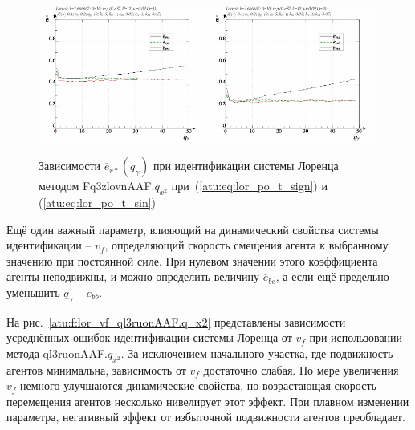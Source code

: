 \begin{figure}[ht!]
  \centerline{
    \includegraphics[width=0.49\textwidth]{p/cha/lor/Fq3zlovnAAF/lor_Fq3zlovnAAF_qx2-p_qg_e_sign.png}
    \hfill
    \includegraphics[width=0.49\textwidth]{p/cha/lor/Fq3zlovnAAF/lor_Fq3zlovnAAF_qx2-p_qg_e_sin.png}
  }
  \caption{Зависимости $\overline{e}_{r*}(q_\gamma)$ при идентификации системы Лоренца методом Fq3zlovnAAF.$q_{x^2}$
   при~(\ref{atu:eq:lor_po_t_sign}) и (\ref{atu:eq:lor_po_t_sin})}
  \label{atu:f:lor_qg_Fq3zlovnAAF.q_x2}
\end{figure}


Ещё один важный параметр, влияющий на динамический свойства
системы идентификации -- $v_f$, определяющий скорость
смещения агента к выбранному значению при постоянной силе.
При нулевом значении этого коэффициента агенты неподвижны,
и можно определить величину $\overline{e}_{be}$,
а если ещё предельно уменьшить $q_\gamma$ --  $\overline{e}_{bb}$.



На рис.~\ref{atu:f:lor_vf_ql3ruonAAF.q_x2} представлены зависимости
усреднённых ошибок идентификации системы Лоренца от $v_f$ при использовании метода ql3ruonAAF.$q_{x^2}$.
За исключением начального участка, где подвижность агентов
минимальна, зависимость от $v_f$ достаточно слабая.
По мере увеличения $v_f$ немного улучшаются динамические свойства,
но возрастающая скорость перемещения агентов
несколько нивелирует этот эффект. При плавном изменении параметра,
негативный эффект от избыточной подвижности агентов преобладает.

